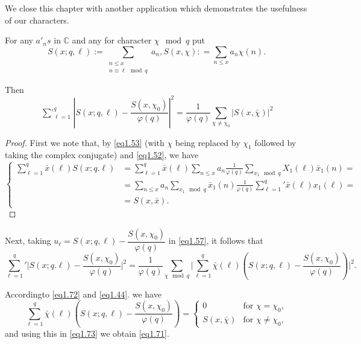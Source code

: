 We close this chapter with another application which demonstrates the
usefulness of our characters. 

\begin{lemma}\label{chap1-lem1.2} %
For any $a'_n s$ in $\mathbb{C}$ and any for character $\chi \mod q$ put
\begin{equation*}
S(x;q, \ell ):= \sum_{\substack{n \leq x \\ n \equiv \ell \mod q}} a_n
, S(x,\chi): = \sum_{n \leq x}a_n\chi(n). \tag{1.70}\label{eq1.70} 
\end{equation*}

Then 
\begin{equation*}
\mathop{\sum{}'}_{\ell = 1}^q | S(x; q, \ell )- \frac{S(x,\chi_0)}{\varphi
  (q)} |^2 = \frac{1}{\varphi (q)} \sum_{\chi \neq \chi_0} |S(x,
\bar{\chi}) |^2 \tag{1.71} \label{eq1.71}
\end{equation*}
\end{lemma}

\begin{proof} %
First we note that, by \eqref{eq1.53} (with $\chi$ being replaced by $\chi_1$
followed by taking the complex conjugate) and \eqref{eq1.52}, we have  
\begin{equation*}
\begin{cases}
\sum\limits_{\ell=1}^q \bar{x}(\ell ) S(x; q . \ell) &=\sum\limits_{\ell =1}^q \bar{x}(\ell ) \sum\limits_{n \leq x} a_n \frac{1}{\varphi (q)} \sum\limits_{x_1 \mod q} X_1 (\ell ) \bar{x}_1 (n) =\\
&=  \sum\limits_{n \le x} a_n \sum\limits_{x_1 \mod q} \bar{x}_1 (n) \frac{1}{\varphi (q)} \sum\limits_{\ell =1}^q{'} \bar{x}(\ell )x_1 (\ell )=\\
& =S(x, \bar{x}).
\end{cases} \tag{1.72}\label{eq1.72}
\end{equation*} 
\end{proof}

Next, taking $u_\ell = S (x; q, \ell)-
\dfrac{S(x,\chi_0)}{\varphi(q)}$ in \eqref{eq1.57}, it follows that  
{\fontsize{10}{12}\selectfont
\begin{equation*}
\sum_{\ell =1}^{q}{'}  \bigg | S(x; q. \ell )- \frac{S(x,\chi_0
  )}{\varphi (q)} \bigg |^2 =\frac{1}{\varphi (q)} \sum_{\chi \mod q}
\bigg |\sum_{\ell =1}^{q} \bar{\chi}(\ell) (S(x;q,\ell)-
\frac{S(x,\chi_0)}{\varphi (q)}) \bigg |^2. \tag{1.73}\label{eq1.73}  
\end{equation*}}

According\pageoriginale to \eqref{eq1.72} and \eqref{eq1.44}. we have 
\begin{equation*}
\sum_{\ell =1}^q \bar{\chi}(\ell ) (S(x;q, \ell)- \frac{S(x,\chi_0)}{\varphi (q)}) =
\begin{cases}
0 & \text{for } \chi=\chi_0,\\
S(x, \bar{\chi}) & \text{for } \chi \neq \chi_0,
\end{cases} \tag{1.74}
\end{equation*}
and using this in \eqref{eq1.73} we obtain \eqref{eq1.71}.

